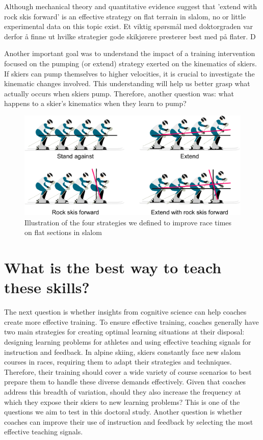 Although mechanical theory and quantitative evidence suggest that 'extend with rock skis forward' is an effective strategy on flat terrain in slalom, no or little experimental data on this topic exist. Et viktig spørsmål med doktorgraden var derfor å finne ut hvilke strategier gode skikjørere presterer best med på flater. D


Another important goal was to understand the impact of a training intervention focused on the pumping (or extend) strategy exerted on the kinematics of skiers. If skiers can pump themselves to higher velocities, it is crucial to investigate the kinematic changes involved. This understanding will help us better grasp what actually occurs when skiers pump. Therefore, another question was: what happens to a skier's kinematics when they learn to pump?

\begin{figure}[H]
    \centering
    \includegraphics[width=1\linewidth]{figure/figure_introduction_strategies.pdf}
    \caption[Illustration of the four strategies we defined to improve race times on flat sections in slalom]{Illustration of the four strategies we defined to improve race times on flat sections in slalom}
    \label{fig: strategies}
\end{figure}

\section{What is the best way to teach these skills?}
The next question is whether insights from cognitive science can help coaches create more effective training. To ensure effective training, coaches generally have two main strategies for creating optimal learning situations at their disposal: designing learning problems for athletes and using effective teaching signals for instruction and feedback. In alpine skiing, skiers constantly face new slalom courses in races, requiring them to adapt their strategies and techniques. Therefore, their training should cover a wide variety of course scenarios to best prepare them to handle these diverse demands effectively. Given that coaches address this breadth of variation, should they also increase the frequency at which they expose their skiers to new learning problems? This is one of the questions we aim to test in this doctoral study. Another question is whether coaches can improve their use of instruction and feedback by selecting the most effective teaching signals.


